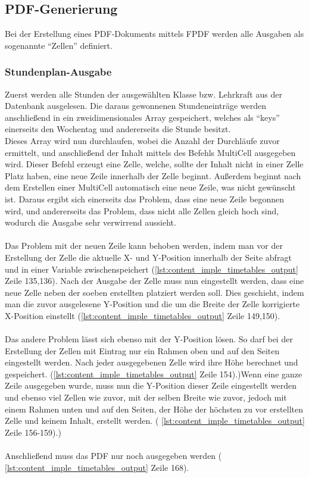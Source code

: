 \subsection{PDF-Generierung}
Bei der Erstellung eines PDF-Dokuments mittels FPDF werden alle Ausgaben als sogenannte \enquote{Zellen} definiert.
\subsubsection{Stundenplan-Ausgabe}
Zuerst werden alle Stunden der ausgewählten Klasse bzw. Lehrkraft aus der Datenbank ausgelesen. Die daraus gewonnenen Stundeneinträge werden anschließend in ein zweidimensionales Array gespeichert, welches als \enquote{keys} einerseits den Wochentag und andererseits die Stunde besitzt. \\
Dieses Array wird nun durchlaufen, wobei die Anzahl der Durchläufe zuvor ermittelt, und anschließend der Inhalt mittels des Befehls MultiCell ausgegeben wird. Dieser Befehl erzeugt eine Zelle, welche, sollte der Inhalt nicht in einer Zelle Platz haben, eine neue Zeile innerhalb der Zelle beginnt. Außerdem beginnt nach dem Erstellen einer MultiCell automatisch eine neue Zeile, was nicht gewünscht ist. Daraus ergibt sich einerseits das Problem, dass eine neue Zeile begonnen wird, und andererseits das Problem, dass nicht alle Zellen gleich hoch sind, wodurch die Ausgabe sehr verwirrend aussieht. \\\\
Das Problem mit der neuen Zeile kann behoben werden, indem man vor der Erstellung der Zelle die aktuelle X- und Y-Position innerhalb der Seite abfragt und in einer Variable zwischenspeichert (\autoref{lst:content_imple_timetables_output} Zeile 135,136). Nach der Ausgabe der Zelle muss nun eingestellt werden, dass eine neue Zelle neben der soeben erstellten platziert werden soll. Dies geschieht, indem man die zuvor ausgelesene Y-Position und die um die Breite der Zelle korrigierte X-Position einstellt (\autoref{lst:content_imple_timetables_output} Zeile 149,150).\\\\
Das andere Problem lässt sich ebenso mit der Y-Position lösen. So darf bei der Erstellung der Zellen mit Eintrag nur ein Rahmen oben und auf den Seiten eingestellt werden. Nach jeder ausgegebenen Zelle wird ihre Höhe berechnet und gespeichert. (\autoref{lst:content_imple_timetables_output} Zeile 154).)Wenn eine ganze Zeile ausgegeben wurde, muss nun die Y-Position dieser Zeile eingestellt werden und ebenso viel Zellen wie zuvor, mit der selben Breite wie zuvor, jedoch mit einem Rahmen unten und auf den Seiten, der Höhe der höchsten zu vor erstellten Zelle und keinem Inhalt, erstellt werden.  ( \autoref{lst:content_imple_timetables_output} Zeile 156-159).)
\\\\
Anschließend muss das PDF nur noch ausgegeben werden ( \autoref{lst:content_imple_timetables_output} Zeile 168). 

